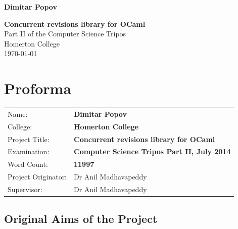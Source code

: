 \documentclass[12pt,twoside,notitlepage]{report}
\begin{document}





\pagestyle{empty}

\hfill{\LARGE \bf Dimitar Popov}

\vspace*{60mm}
\begin{center}
\Huge
{\bf Concurrent revisions library for OCaml} \\
\vspace*{5mm}
Part II of the Computer
Science Tripos\\
\vspace*{5mm}
Homerton College \\
\vspace*{5mm}
\today  %
\end{center}

\cleardoublepage


\setcounter{page}{1}
\pagestyle{plain}

\chapter*{Proforma}

{\large
\begin{tabular}{ll} 
Name:               & \bf Dimitar Popov                     \\
College:            & \bf Homerton College                     \\
Project Title:      & \bf Concurrent revisions library for OCaml \\
Examination:        & \bf Computer Science Tripos Part II, July 2014        \\
Word Count:         & \bf 11997\footnotemark[1]
\\
Project Originator: & Dr Anil Madhavapeddy                    \\
Supervisor:         & Dr Anil Madhavapeddy                    \\ 
\end{tabular} 
}


\section*{Original Aims of the Project}
\end{document}
